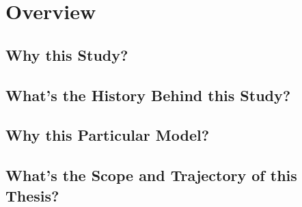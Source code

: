 \chapter{Overview}
\label{chap:overview}

\section{Why this Study?}

\section{What's the History Behind this Study?}

\section{Why this Particular Model?}

\section{What's the Scope and Trajectory of this Thesis?}
